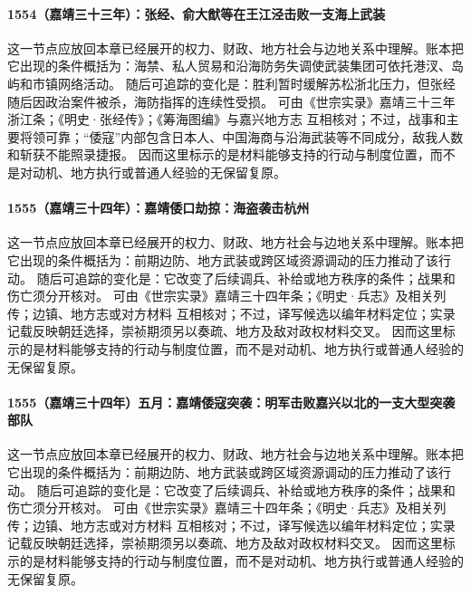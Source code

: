\paragraph{1554（嘉靖三十三年）：张经、俞大猷等在王江泾击败一支海上武装} 这一节点应放回本章已经展开的权力、财政、地方社会与边地关系中理解。账本把它出现的条件概括为：海禁、私人贸易和沿海防务失调使武装集团可依托港汊、岛屿和市镇网络活动。 随后可追踪的变化是：胜利暂时缓解苏松浙北压力，但张经随后因政治案件被杀，海防指挥的连续性受损。 可由《世宗实录》嘉靖三十三年浙江条；《明史·张经传》；《筹海图编》与嘉兴地方志 互相核对；不过，战事和主要将领可靠；“倭寇”内部包含日本人、中国海商与沿海武装等不同成分，敌我人数和斩获不能照录捷报。 因而这里标示的是材料能够支持的行动与制度位置，而不是对动机、地方执行或普通人经验的无保留复原。

\paragraph{1555（嘉靖三十四年）：嘉靖倭口劫掠：海盗袭击杭州} 这一节点应放回本章已经展开的权力、财政、地方社会与边地关系中理解。账本把它出现的条件概括为：前期边防、地方武装或跨区域资源调动的压力推动了该行动。 随后可追踪的变化是：它改变了后续调兵、补给或地方秩序的条件；战果和伤亡须分开核对。 可由《世宗实录》嘉靖三十四年条；《明史·兵志》及相关列传；边镇、地方志或对方材料 互相核对；不过，译写候选以编年材料定位；实录记载反映朝廷选择，崇祯期须另以奏疏、地方及敌对政权材料交叉。 因而这里标示的是材料能够支持的行动与制度位置，而不是对动机、地方执行或普通人经验的无保留复原。

\paragraph{1555（嘉靖三十四年）五月：嘉靖倭寇突袭：明军击败嘉兴以北的一支大型突袭部队} 这一节点应放回本章已经展开的权力、财政、地方社会与边地关系中理解。账本把它出现的条件概括为：前期边防、地方武装或跨区域资源调动的压力推动了该行动。 随后可追踪的变化是：它改变了后续调兵、补给或地方秩序的条件；战果和伤亡须分开核对。 可由《世宗实录》嘉靖三十四年条；《明史·兵志》及相关列传；边镇、地方志或对方材料 互相核对；不过，译写候选以编年材料定位；实录记载反映朝廷选择，崇祯期须另以奏疏、地方及敌对政权材料交叉。 因而这里标示的是材料能够支持的行动与制度位置，而不是对动机、地方执行或普通人经验的无保留复原。

